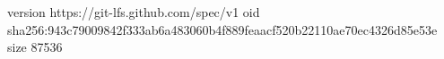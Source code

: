 version https://git-lfs.github.com/spec/v1
oid sha256:943c79009842f333ab6a483060b4f889feaacf520b22110ae70ec4326d85e53e
size 87536

